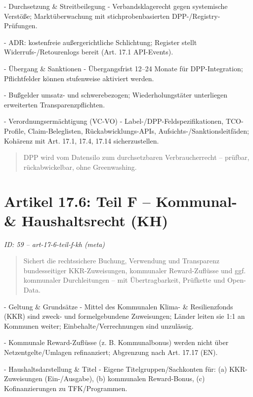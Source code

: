 \documentclass[12pt,a4paper]{scrartcl}
\begin{document}
- Durchsetzung \& Streitbeilegung
- Verbandsklagerecht gegen systemische Verstöße; Marktüberwachung mit stichprobenbasierten DPP-/Registry-Prüfungen.

- ADR: kostenfreie außergerichtliche Schlichtung; Register stellt Widerrufs-/Retourenlogs bereit (Art. 17.1 API-Events).

- Übergang \& Sanktionen
- Übergangsfrist 12--24 Monate für DPP-Integration; Pflichtfelder können stufenweise aktiviert werden.

- Bußgelder umsatz- und schwerebezogen; Wiederholungstäter unterliegen erweiterten Transparenzpflichten.

- Verordnungsermächtigung (VC-VO)
- Label-/DPP-Feldspezifikationen, TCO-Profile, Claim-Beleglisten, Rückabwicklungs-APIs, Aufsichts-/Sanktionsleitfäden; Kohärenz mit Art. 17.1, 17.4, 17.14 sicherzustellen.

{\footnotesize\begin{quote}
DPP wird vom Datensilo zum durchsetzbaren Verbraucherrecht -- prüfbar, rückabwickelbar, ohne Greenwashing.
\end{quote}}



\section[Artikel 17.6: Teil F -- Kommunal- \& Haushaltsrecht (KH)]{Artikel 17.6: Teil F -- Kommunal- \& Haushaltsrecht (KH)}
\noindent\textit{ID: 59 -- art-17-6-teil-f-kh (meta)}

\begin{quote}
Sichert die rechtssichere Buchung, Verwendung und Transparenz bundesseitiger KKR-Zuweisungen, kommunaler Reward-Zuflüsse und ggf. kommunaler Durchleitungen -- mit Übertragbarkeit, Prüfkette und Open-Data.
\end{quote}

- Geltung \& Grundsätze
- Mittel des Kommunalen Klima- \& Resilienzfonds (KKR) sind zweck- und formelgebundene Zuweisungen; Länder leiten sie 1:1 an Kommunen weiter; Einbehalte/Verrechnungen sind unzulässig.

- Kommunale Reward-Zuflüsse (z. B. Kommunalbonus) werden nicht über Netzentgelte/Umlagen refinanziert; Abgrenzung nach Art. 17.17 (EN).

- Haushaltsdarstellung \& Titel
- Eigene Titelgruppen/Sachkonten für: (a) KKR-Zuweisungen (Ein-/Ausgabe), (b) kommunalen Reward-Bonus, (c) Kofinanzierungen zu TFK/Programmen.
\end{document}
